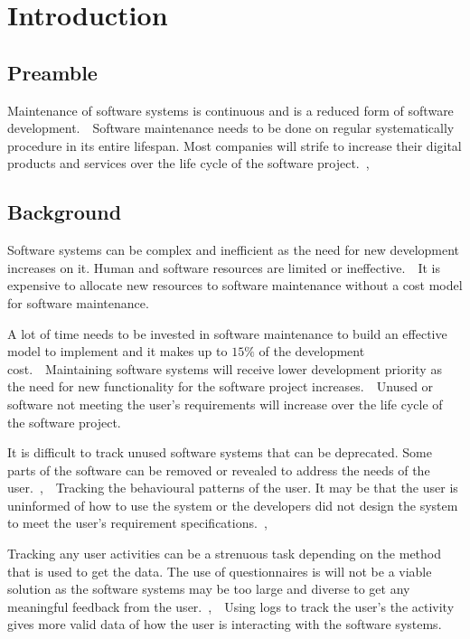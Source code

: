 \chapter{Introduction}
\label{chap:1}

\section{Preamble}
Maintenance of software systems is continuous and is a reduced form of software
development.~\cite{Sneed2004}~Software maintenance needs to be done on regular
systematically procedure in its entire lifespan. Most companies will strife to increase their digital products and services over the life cycle of the software project.~\cite{Niu2018},~\cite{Galster2019}

\section{Background}
Software systems can be complex and inefficient as the need for new development increases on it. Human and software resources are limited or ineffective.~\cite{Pecchia2015}~It is expensive to allocate new resources to software maintenance without a cost model for software
maintenance.~\cite{Galster2019}\par A lot of time needs to be invested in
software maintenance to build an effective model to implement and it makes up to
$15\%$ of the development cost.~\cite{Lenarduzzi2017}~Maintaining software
systems will receive lower development priority as the need for new
functionality for the software project increases.~\cite{Sneed2004}~Unused or
software not meeting the user's requirements will increase over the life cycle
of the software project.~\cite{Thankachan2018}\par It is difficult to track
unused software systems that can be deprecated. Some parts of the software can
be removed or revealed to address the needs of the
user.~\cite{Dalpiaz2018},~\cite{Shahid2016}~Tracking the behavioural patterns of
the user. It may be that the user is uninformed of how to use the system or the
developers did not design the system to meet the user's requirement
specifications.~\cite{Slaninova2014},~\cite{Chen2019}\par Tracking any user
activities can be a strenuous task depending on the method that is used to get the
data. The use of questionnaires is will not be a viable solution as the software
systems may be too large and diverse to get any meaningful feedback from the
user.~\cite{Slaninova2014},~\cite{Waqar2017}~Using logs to track the user's
the activity gives more valid data of how the user is interacting with the software
systems.~\cite{Lei2018}

